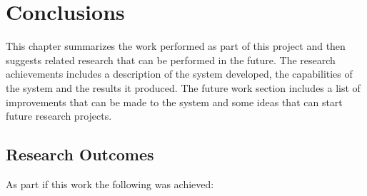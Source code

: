 \chapter{Conclusions}
\label{ch:conclusions}

This chapter summarizes the work performed as part of this project and then suggests related research that can be performed in the future. The research achievements includes a description of the system developed, the capabilities of the system and the results it produced. The future work section includes a list of improvements that can be made to the system and some ideas that can start future research projects.\\

\section{Research Outcomes}

As part if this work the following was achieved:

